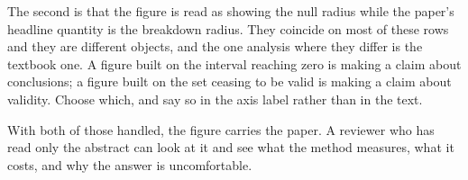 The second is that the figure is read as showing the null radius while the paper's headline quantity
is the breakdown radius. They coincide on most of these rows and they are different objects, and the one
analysis where they differ is the textbook one. A figure built on the interval reaching zero is
making a claim about conclusions; a figure built on the set ceasing to be valid is making a claim
about validity. Choose which, and say so in the axis label rather than in the text.

With both of those handled, the figure carries the paper. A reviewer who has read only the abstract
can look at it and see what the method measures, what it costs, and why the answer is uncomfortable.
